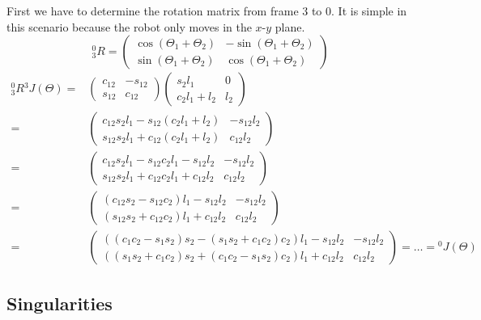 \documentclass[10pt,a4paper]{article}
\begin{document}
First we have to determine the rotation matrix from frame $3$ to $0$.
It is simple in this scenario because the robot only moves in the $x$-$y$ plane.
\begin{equation*}
  {}^{0}_{3}R = \begin{pmatrix}
    \cos(\Theta_{1} + \Theta_{2}) & -\sin(\Theta_{1} + \Theta_{2})\\
    \sin(\Theta_{1} + \Theta_{2}) & \cos(\Theta_{1} + \Theta_{2})
  \end{pmatrix}
\end{equation*}
\begin{align*}
  {}^{0}_{3}R{}^{3}J(\Theta) = & \begin{pmatrix}
    c_{12} & -s_{12}\\
    s_{12} & c_{12}
  \end{pmatrix} \begin{pmatrix}
    s_{2}l_{1} & 0\\
    c_{2}l_{1} + l_{2} & l_{2}
  \end{pmatrix}\\
  = & \begin{pmatrix}
    c_{12}s_{2}l_{1} - s_{12}(c_{2}l_{1} + l_{2}) & -s_{12}l_{2}\\
    s_{12}s_{2}l_{1} + c_{12}(c_{2}l_{1} + l_{2}) & c_{12}l_{2}
  \end{pmatrix}\\
  = & \begin{pmatrix}
    c_{12}s_{2}l_{1} - s_{12}c_{2}l_{1} - s_{12}l_{2} & -s_{12}l_{2}\\
    s_{12}s_{2}l_{1} + c_{12}c_{2}l_{1} + c_{12}l_{2} & c_{12}l_{2}
  \end{pmatrix}\\
  = & \begin{pmatrix}
    (c_{12}s_{2} - s_{12}c_{2})l_{1} - s_{12}l_{2} & -s_{12}l_{2}\\
    (s_{12}s_{2} + c_{12}c_{2})l_{1} + c_{12}l_{2} & c_{12}l_{2}
  \end{pmatrix}\\
  = & \begin{pmatrix}
    ((c_{1}c_{2} - s_{1}s_{2})s_{2} - (s_{1}s_{2} + c_{1}c_{2})c_{2})l_{1} - s_{12}l_{2} & -s_{12}l_{2}\\
    ((s_{1}s_{2} + c_{1}c_{2})s_{2} + (c_{1}c_{2} - s_{1}s_{2})c_{2})l_{1} + c_{12}l_{2} & c_{12}l_{2}
  \end{pmatrix} = \dots = {}^{0}J(\Theta)
\end{align*}

\subsection*{Singularities}
\end{document}
